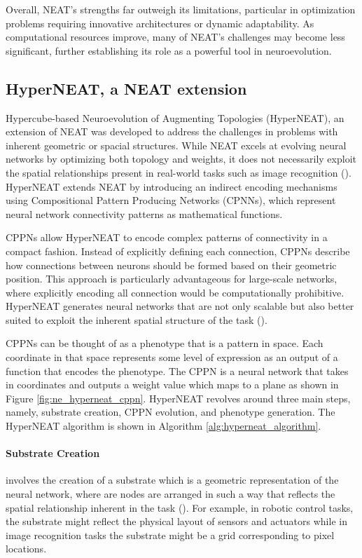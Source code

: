 \parbreak\noindent Overall, NEAT's strengths far outweigh its limitations, particular in optimization problems requiring innovative architectures or dynamic adaptability. As computational resources improve, many of NEAT's challenges may become less significant, further establishing its role as a powerful tool in neuroevolution.

\subsection{HyperNEAT, a NEAT extension}
Hypercube-based Neuroevolution of Augmenting Topologies (HyperNEAT), an extension of NEAT was developed to address the challenges in problems with inherent geometric or spacial structures. While NEAT excels at evolving neural networks by optimizing both topology and weights, it does not necessarily exploit the spatial relationships present in real-world tasks such as image recognition (\cite{stanley2009hypercube}). HyperNEAT extends NEAT by introducing an indirect encoding mechanisms using Compositional Pattern Producing Networks (CPNNs), which represent neural network connectivity patterns as mathematical functions.

\parbreak\noindent CPPNs allow HyperNEAT to encode complex patterns of connectivity in a compact fashion. Instead of explicitly defining each connection, CPPNs describe how connections between neurons should be formed based on their geometric position. This approach is particularly advantageous for large-scale networks, where explicitly encoding all connection would be computationally prohibitive. HyperNEAT generates neural networks that are not only scalable but also better suited to exploit the inherent spatial structure of the task (\cite{stanley2009hypercube}).

\parbreak\noindent CPPNs can be thought of as a phenotype that is a pattern in space. Each coordinate in that space represents some level of expression as an output of a function that encodes the phenotype. The CPPN is a neural network that takes in coordinates and outputs a weight value which maps to a plane as shown in Figure \ref{fig:ne_hyperneat_cppn}. HyperNEAT revolves around three main steps, namely, substrate creation, CPPN evolution, and phenotype generation. The HyperNEAT algorithm is shown in Algorithm \ref{alg:hyperneat_algorithm}.

\parbreak\noindent \paragraph{Substrate Creation} involves the creation of a substrate which is a geometric representation of the neural network, where are nodes are arranged in such a way that reflects the spatial relationship inherent in the task (\cite{stanley2009hypercube}). For example, in robotic control tasks, the substrate might reflect the physical layout of sensors and actuators while in image recognition tasks the substrate might be a grid corresponding to pixel locations.


